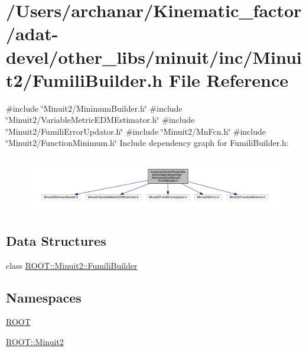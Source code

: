 \hypertarget{adat-devel_2other__libs_2minuit_2inc_2Minuit2_2FumiliBuilder_8h}{}\section{/\+Users/archanar/\+Kinematic\+\_\+factor/adat-\/devel/other\+\_\+libs/minuit/inc/\+Minuit2/\+Fumili\+Builder.h File Reference}
\label{adat-devel_2other__libs_2minuit_2inc_2Minuit2_2FumiliBuilder_8h}
{\ttfamily \#include \char`\"{}Minuit2/\+Minimum\+Builder.\+h\char`\"{}}\newline
{\ttfamily \#include \char`\"{}Minuit2/\+Variable\+Metric\+E\+D\+M\+Estimator.\+h\char`\"{}}\newline
{\ttfamily \#include \char`\"{}Minuit2/\+Fumili\+Error\+Updator.\+h\char`\"{}}\newline
{\ttfamily \#include \char`\"{}Minuit2/\+Mn\+Fcn.\+h\char`\"{}}\newline
{\ttfamily \#include \char`\"{}Minuit2/\+Function\+Minimum.\+h\char`\"{}}\newline
Include dependency graph for Fumili\+Builder.\+h\+:
\nopagebreak
\begin{figure}[H]
\begin{center}
\leavevmode
\includegraphics[width=350pt]{de/d31/adat-devel_2other__libs_2minuit_2inc_2Minuit2_2FumiliBuilder_8h__incl}
\end{center}
\end{figure}
\subsection*{Data Structures}
\begin{DoxyCompactItemize}
\item 
class \mbox{\hyperlink{classROOT_1_1Minuit2_1_1FumiliBuilder}{R\+O\+O\+T\+::\+Minuit2\+::\+Fumili\+Builder}}
\end{DoxyCompactItemize}
\subsection*{Namespaces}
\begin{DoxyCompactItemize}
\item 
 \mbox{\hyperlink{namespaceROOT}{R\+O\+OT}}
\item 
 \mbox{\hyperlink{namespaceROOT_1_1Minuit2}{R\+O\+O\+T\+::\+Minuit2}}
\end{DoxyCompactItemize}
